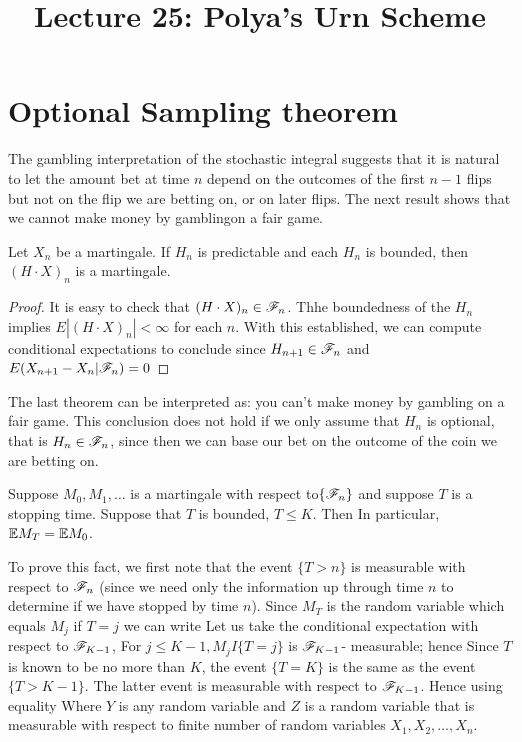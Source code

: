 \documentclass[a4paper,english,10pt]{article}
\title{Lecture 25: Polya's Urn Scheme}
\author{}
\begin{document}
\maketitle
\section{Optional Sampling theorem}
The gambling interpretation of the stochastic integral suggests that it is natural to let the amount bet at time $n$ depend on the outcomes of the first $n-1$ flips but not on the flip we are betting on, or on later flips. The next result shows that we cannot make money by gamblingon a fair game.

\begin{thm}Let $X_n$ be a martingale. If $H_n$ is predictable and each $H_n$ is bounded, then $(H\cdot X)_n$ is a martingale.
\end{thm}
\begin{proof} It is easy to check that $(H\cdot X)_n \in \mathscr{F}_n$. Thhe boundedness of the $H_n$ implies $E|(H\cdot X)_n|<\infty$ for each $n$. With this established, we can compute conditional expectations to conclude
since $H_{n+1}\in \mathscr{F}_n$ and $E(X_{n+1}-X_n| \mathscr{F}_n)=0$
\end{proof}
The last theorem can be interpreted as: you can't make money by gambling on a fair game. This conclusion does not hold if we only assume that $H_n$ is optional, that is $H_n\in \mathscr{F}_n$, since then we can base our bet on the outcome of the coin we are betting on.

\begin{thm} 
Suppose $M_0,M_1,\dots $ is a martingale with respect to$\{\mathscr{F}_n\}$ and suppose $T$ is a stopping time. Suppose that $T$ is bounded, $T\leq K$. Then
In particular, $\mathbb{E} M_T=\mathbb{E} M_0$.
\end{thm}
To prove this fact, we first note that the event $\{T>n\}$ is measurable with respect to $\mathscr{F}_n$ (since we need only the information up through time $n$ to determine if we have stopped by time $n$). 
Since $M_T$ is the random variable which equals $M_j$ if $T=j$ we can write
Let us take the conditional expectation with respect to $\mathscr{F}_{K-1}$,
For $j\leq K-1, M_jI\{T=j\}$ is $\mathscr{F}_{K-1}$- measurable; hence
Since $T$ is known to be no more than $K$, the event $\{T=K\}$ is the same as the event $\{T>K-1\}$. The latter event is measurable with respect to $\mathscr{F}_{K-1}$. Hence using equality
Where $Y$ is any random variable and $Z$ is a random variable that is measurable with respect to finite number of random variables $X_1,X_2,\dots,X_n$.
\end{document}
